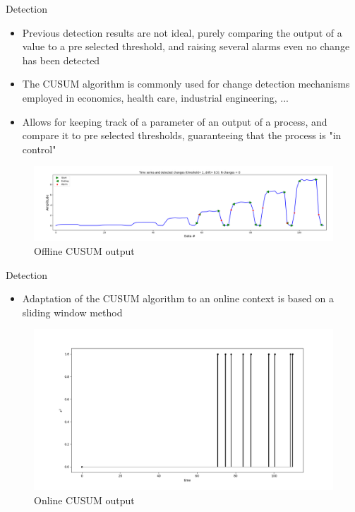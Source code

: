 \documentclass{beamer}
\begin{document}
\begin{frame}{Detection}
    \begin{itemize}
        \item Previous detection results are not ideal, purely comparing the output
            of a value to a pre selected threshold, and raising several alarms
            even no change has been detected
            \pause
        \item The CUSUM algorithm is commonly used for change detection mechanisms employed
            in economics, health care, industrial engineering, ...
        \item Allows for keeping track of a parameter of an output of a process, and 
            compare it to pre selected thresholds, guaranteeing that the process is "in control"
    \end{itemize}
    \pause
    \begin{figure}
        \includegraphics[width=1\textwidth]{meter_eleph/offline_cusum_output}
        \caption{Offline CUSUM output}
    \end{figure}
\end{frame}

\begin{frame}{Detection}
    \begin{itemize}
        \item Adaptation of the CUSUM algorithm to an online context is based on a sliding window
            method 
    \end{itemize}
    \pause
    \begin{figure}
        \includegraphics[width=.7\textwidth]{meter_eleph/online_cusum_output}
        \caption{Online CUSUM output}
    \end{figure}
\end{frame}
\end{document}
